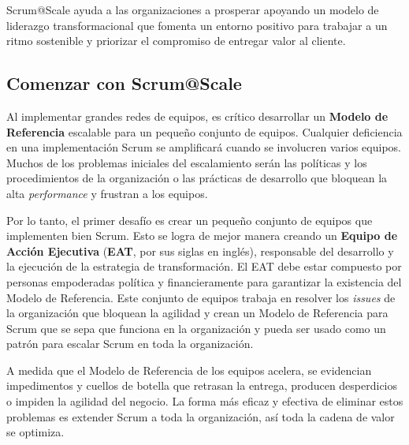 \documentclass{article} %
\begin{document}
\noindent Scrum@Scale ayuda a las organizaciones a prosperar apoyando un modelo de liderazgo transformacional que fomenta un entorno positivo para trabajar a un ritmo sostenible y priorizar el compromiso de entregar valor al cliente.

\noindent 
\subsection{}

\noindent 
\subsection{Comenzar con Scrum@Scale}

\noindent 

\noindent Al implementar grandes redes de equipos, es cr\'{i}tico desarrollar un \textbf{Modelo de Referencia} escalable para un peque\~{n}o conjunto de equipos. Cualquier deficiencia en una implementaci\'{o}n Scrum se amplificar\'{a} cuando se involucren varios equipos. Muchos de los problemas iniciales del escalamiento ser\'{a}n las pol\'{i}ticas y los procedimientos de la organizaci\'{o}n o las pr\'{a}cticas de desarrollo que bloquean la alta \textit{performance }y frustran a los equipos.

\noindent 

\noindent Por lo tanto, el primer desaf\'{i}o es crear un peque\~{n}o conjunto de equipos que implementen bien Scrum. Esto se logra de mejor manera creando un \textbf{Equipo de Acci\'{o}n Ejecutiva} (\textbf{EAT}, por sus siglas en ingl\'{e}s), responsable del desarrollo y la ejecuci\'{o}n de la estrategia de transformaci\'{o}n. El EAT debe estar compuesto por personas empoderadas pol\'{i}tica y financieramente para garantizar la existencia del Modelo de Referencia. Este conjunto de equipos trabaja en resolver los \textit{issues }de la organizaci\'{o}n que bloquean la agilidad y crean un Modelo de Referencia para Scrum que se sepa que funciona en la organizaci\'{o}n y pueda ser usado como un patr\'{o}n para escalar Scrum en toda la organizaci\'{o}n.

\noindent 

\noindent A medida que el Modelo de Referencia de los equipos acelera, se evidencian impedimentos y cuellos de botella que retrasan la entrega, producen desperdicios o impiden  la agilidad del negocio. La forma m\'{a}s eficaz y efectiva de eliminar estos problemas es extender Scrum a toda la organizaci\'{o}n, as\'{i} toda la cadena de valor se optimiza.
\end{document}
